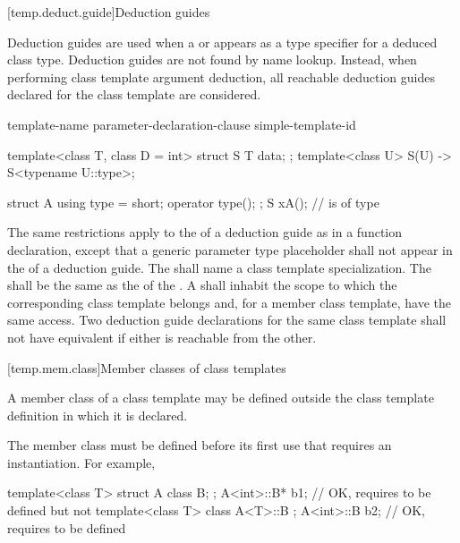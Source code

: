 [temp.deduct.guide]{Deduction guides}
%

\pnum
Deduction guides are used
when a  or 
appears as a type specifier
for a deduced class type.
Deduction guides are not found by name lookup.
Instead, when performing class template argument deduction,
all reachable deduction guides declared for the class template are considered.

\begin{bnf}
\br
     template-name \terminal{(} parameter-declaration-clause \terminal{)} \terminal{->} simple-template-id  \terminal{;}
\end{bnf}

\pnum
\begin{example}
\begin{codeblock}
template<class T, class D = int>
struct S {
  T data;
};
template<class U>
S(U) -> S<typename U::type>;

struct A {
  using type = short;
  operator type();
};
S x{A()};           //  is of type 
\end{codeblock}
\end{example}

\pnum
The same restrictions apply
to the 
of a deduction guide
as in a function declaration,
except that a generic parameter type placeholder
shall not appear in the  of
a deduction guide.
The 
shall name a class template specialization.
The 
shall be the same 
as the 
of the .
A 
shall inhabit the scope
to which the corresponding class template belongs
and, for a member class template, have the same access.
Two deduction guide declarations
for the same class template
shall not have equivalent 
if either is reachable from the other.

[temp.mem.class]{Member classes of class templates}

\pnum
A member class of a class template may be defined outside the class template
definition in which it is declared.
\begin{note}
The member class must be defined before its first use that requires
an instantiation.
For example,
\begin{codeblock}
template<class T> struct A {
  class B;
};
A<int>::B* b1;                          // OK, requires  to be defined but not 
template<class T> class A<T>::B { };
A<int>::B  b2;                          // OK, requires  to be defined
\end{codeblock}
\end{note}

